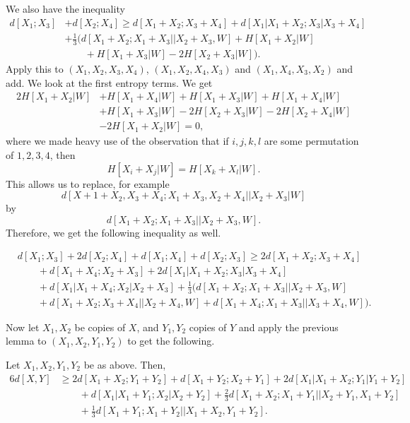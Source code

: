 \documentclass[12pt]{article}
\begin{document}

We also have the inequality
\begin{align*}
	d[X_1; X_3] &+ d[X_2; X_4] \geq d[X_1 + X_2; X_3 + X_4] + d[X_1|X_1+X_2; X_3|X_3+X_4] \\
		    & + \frac 13 \biggl( d[X_1 + X_2; X_1 + X_3 || X_2 + X_3, W] + H[X_1 + X_2|W] \\
		    & \qquad + H[X_1+X_3|W] - 2H[X_2+X_3|W] \biggr).
\end{align*}
Apply this to $(X_1, X_2, X_3, X_4)$, $(X_1, X_2, X_4, X_3)$ and $(X_1, X_4, X_3, X_2)$ and add. We look at the first entropy terms. We get
\begin{align*}
	2H[X_1+X_2|W] &+ H[X_1+X_4|W] + H[X_1+X_3|W] + H[X_1+X_4|W] \\
		      &+ H[X_1+X_3|W] - 2H[X_2+X_3|W] - 2H[X_2+X_4|W] \\
		      &- 2H[X_1+X_2|W] = 0,
\end{align*}
where we made heavy use of the observation that if $i, j, k, l$ are some permutation of $1, 2, 3, 4$, then
\[
	H[X_i + X_j | W] = H[X_k + X_l | W].
\]
This allows us to replace, for example
\[
	d[X+1+X_2, X_3+X_4; X_1+X_3,X_2+X_4 || X_2+X_3|W]
\]
by
\[
	d[X_1+X_2;X_1+X_3 ||X_2+X_3, W].
\]
Therefore, we get the following inequality as well.
\begin{lemma}
	\begin{align*}
		& d[X_1; X_3] + 2 d[X_2; X_4] + d[X_1; X_4] + d[X_2; X_3] \geq 2d[X_1+X_2; X_3+X_4] \\
			    & \qquad + d[X_1 + X_4; X_2 + X_3] + 2d[X_1|X_1+X_2; X_3|X_3+X_4] \\
			    & \qquad + d[X_1|X_1+X_4;X_2|X_2+X_3]  + \frac 13 \biggl( d[X_1+X_2;X_1+X_3||X_2+X_3, W] \\
			    & \qquad + d[X_1+X_2; X_3 + X_4||X_2 + X_4, W] + d[X_1 + X_4; X_1 + X_3 || X_3 + X_4, W] \biggr).
	\end{align*}
\end{lemma}

Now let $X_1, X_2$ be copies of $X$, and $Y_1, Y_2$ copies of $Y$ and apply the previous lemma to $(X_1, X_2, Y_1, Y_2)$ to get the following.

\begin{lemma}
	Let $X_1, X_2, Y_1, Y_2$ be as above. Then,
	\begin{align*}
		6 d[X, Y] &\geq 2 d[X_1 + X_2; Y_1 + Y_2] + d[X_1 + Y_2; X_2 + Y_1] + 2 d[X_1|X_1+X_2; Y_1|Y_1+Y_2] \\
			  & \qquad + d[X_1|X_1+Y_1; X_2|X_2+Y_2] + \frac 23 d[X_1 + X_2; X_1 + Y_1 || X_2 + Y_1, X_1 + Y_2] \\
			  & \qquad + \frac 13 d[X_1 + Y_1; X_1 + Y_2 || X_1 + X_2, Y_1 + Y_2].
	\end{align*}
\end{lemma}
\end{document}

